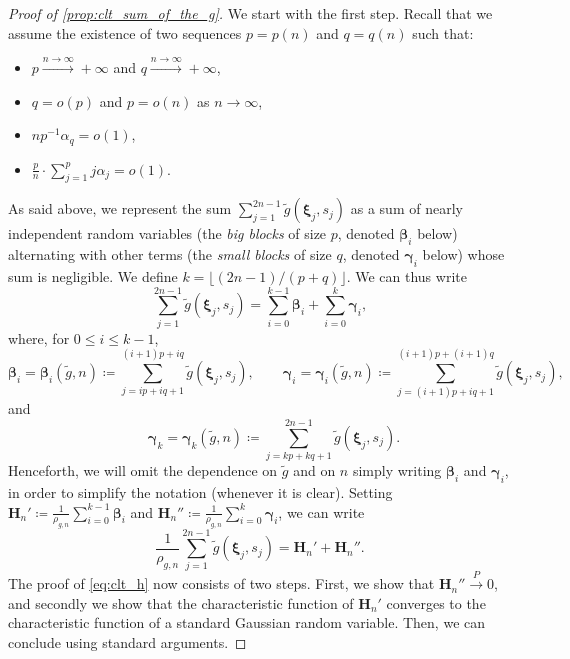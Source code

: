 \documentclass[11pt,a4paper,oneside]{article}
\theoremstyle{definition}
\theoremstyle{remark}
\begin{document}
\begin{proof}[Proof of \cref{prop:clt_sum_of_the_g}]
	We start with the first step. Recall that we assume the existence of two sequences $p=p(n)$ and $q=q(n)$ such that:
	\begin{itemize}
		\item  	$p\xrightarrow{n\to\infty} +\infty$ and $q\xrightarrow{n\to\infty} +\infty$,
		\item 	$q=o(p)$ and $p=o(n)$ as $n \to \infty$,
		\item   $n p^{-1 } \alpha_q=o(1)$,
		\item   $  \frac{p}{n}  \cdot \sum_{j=1}^p j \alpha_j = o(1)$.
	\end{itemize}
	As said above, we represent the sum $\sum_{j=1}^{2n-1}\tilde{g}\left(\bm \xi_j,s_j\right)$ as a sum of nearly independent random variables (the \emph{big blocks} of size $p$, denoted $\bm \beta_i$ below) alternating with other terms (the \emph{small blocks} of size $q$, denoted $\bm \gamma_i$ below) whose sum is negligible.
	We define $k = \lfloor (2n-1)/(p+q) \rfloor$.
	We can thus write 
	\begin{equation}
		\sum_{j=1}^{2n-1}\tilde{g}\left(\bm \xi_j,s_j\right) = \sum_{i=0}^{k-1} \bm \beta_i +  \sum_{i=0}^k \bm \gamma_i, 
	\end{equation}
	where, for $0\leq i \leq k-1$,
	\begin{equation}
	 \bm \beta_i= \bm \beta_i (\tilde g, n) \coloneqq \sum_{j=ip+iq+1}^{(i+1)p+iq} \tilde g \left(\bm \xi_j,s_j\right), \quad\quad 
	 \bm \gamma_i= \bm \gamma_i (\tilde g, n) \coloneqq \sum_{j=(i+1)p+iq+1}^{(i+1)p+(i+1)q} \tilde g\left(\bm \xi_j,s_j\right),
	\end{equation}
	and 
	\begin{equation}
	\quad \quad \bm \gamma_k=\bm \gamma_k(\tilde g, n) \coloneqq \sum_{j=kp+kq+1}^{2n-1}  \tilde g\left(\bm \xi_j,s_j\right).
	\end{equation}
	Henceforth, we will omit the dependence on $\tilde g$ and on $n$ simply writing $\bm \beta_i$ and $\bm \gamma_i$, in order to simplify the notation (whenever it is clear). Setting $\bm H_n'\coloneqq \frac{1}{\rho_{g,n}} \sum_{i=0}^{k-1} \bm \beta_i$ and $\bm H_n''\coloneqq \frac{1}{\rho_{g,n}}   \sum_{i=0}^k \bm \gamma_i $, we can write 
	\begin{equation}
	\frac{1}{\rho_{g,n}}\sum_{j=1}^{2n-1}\tilde{g}\left(\bm \xi_j,s_j\right) = 	 \bm H_n' + \bm H_n''.
	\end{equation}
	 The proof of \cref{eq:clt_h} now consists of two steps. First, we show that $\bm H_n''\xrightarrow{P} 0$,  and secondly we show that the characteristic function of $\bm H_n'$ converges to the characteristic function of a standard Gaussian random variable. Then, we can conclude using standard arguments. 


\end{proof}
\end{document}
